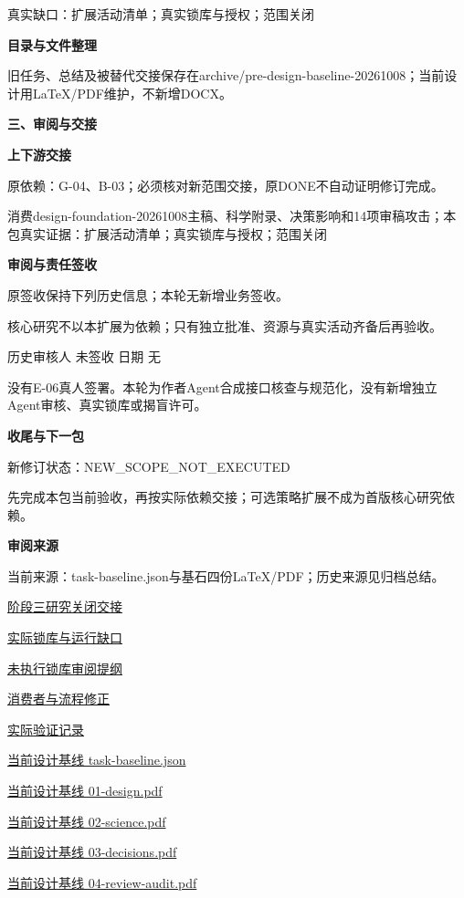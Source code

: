 \documentclass[11pt,a4paper]{article}
\newcommand{\reviewsection}[1]{\par\Needspace{5\baselineskip}\vspace{10pt}\begin{center}{\titlelatin\titlecjk\bfseries\fontsize{14}{20}\selectfont #1}\end{center}}
\newcommand{\reviewsubsection}[1]{\par\Needspace{4\baselineskip}\vspace{4pt}\begin{center}{\titlelatin\titlecjk\bfseries\fontsize{12}{18}\selectfont #1}\end{center}}
\begin{document}
真实缺口：扩展活动清单；真实锁库与授权；范围关闭


\reviewsubsection{2.4 目录与文件整理}
旧任务、总结及被替代交接保存在archive/\allowbreak{}pre-\allowbreak{}design-\allowbreak{}baseline-\allowbreak{}20261008；当前设计用LaTeX/\allowbreak{}PDF维护，不新增DOCX。


\reviewsection{三、审阅与交接}
\reviewsubsection{3.1 上下游交接}
原依赖：G-\allowbreak{}04、B-\allowbreak{}03；必须核对新范围交接，原DONE不自动证明修订完成。


消费design-\allowbreak{}foundation-\allowbreak{}20261008主稿、科学附录、决策影响和14项审稿攻击；本包真实证据：扩展活动清单；真实锁库与授权；范围关闭


\reviewsubsection{3.2 审阅与责任签收}
原签收保持下列历史信息；本轮无新增业务签收。


核心研究不以本扩展为依赖；只有独立批准、资源与真实活动齐备后再验收。


历史审核人 未签收    日期 无


没有E-\allowbreak{}06真人签署。本轮为作者Agent合成接口核查与规范化，没有新增独立Agent审核、真实锁库或揭盲许可。


\reviewsubsection{3.3 收尾与下一包}
新修订状态：NEW\_\allowbreak{}SCOPE\_\allowbreak{}NOT\_\allowbreak{}EXECUTED


先完成本包当前验收，再按实际依赖交接；可选策略扩展不成为首版核心研究依赖。


\reviewsubsection{3.4 审阅来源}
当前来源：task-\allowbreak{}baseline.json与基石四份LaTeX/\allowbreak{}PDF；历史来源见归档总结。


\href{file:///D:/Agent/srp/agent/tasks/E-06/outputs/current-closeout.md}{阶段三研究关闭交接}


\href{file:///D:/Agent/srp/agent/tasks/E-06/outputs/current-closeout.json}{实际锁库与运行缺口}


\href{file:///D:/Agent/srp/agent/tasks/E-06/outputs/lock-review-template.json}{未执行锁库审阅提纲}


\href{file:///D:/Agent/srp/agent/tasks/E-06/evidence/consumer-impact.md}{消费者与流程修正}


\href{file:///D:/Agent/srp/agent/tasks/E-06/evidence/verification.json}{实际验证记录}


\href{file:///D:/Agent/srp/agent/design/design-foundation-20261008/task-baseline.json}{当前设计基线 task-\allowbreak{}baseline.json}


\href{file:///D:/Agent/srp/agent/design/design-foundation-20261008/01-design.pdf}{当前设计基线 01-\allowbreak{}design.pdf}


\href{file:///D:/Agent/srp/agent/design/design-foundation-20261008/02-science.pdf}{当前设计基线 02-\allowbreak{}science.pdf}


\href{file:///D:/Agent/srp/agent/design/design-foundation-20261008/03-decisions.pdf}{当前设计基线 03-\allowbreak{}decisions.pdf}


\href{file:///D:/Agent/srp/agent/design/design-foundation-20261008/04-review-audit.pdf}{当前设计基线 04-\allowbreak{}review-\allowbreak{}audit.pdf}
\end{document}

